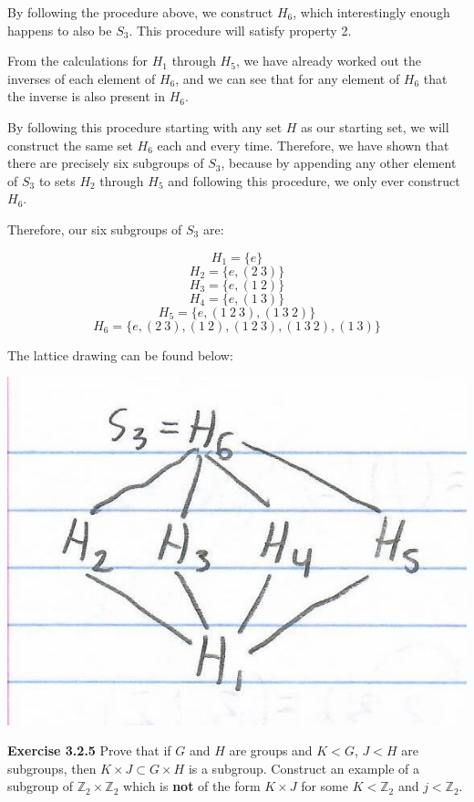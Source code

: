 \documentclass[a4paper]{article}
\begin{document}
\begin{myparindent}{0pt}
By following the procedure above, we construct $H_6$, which interestingly enough
happens to also be $S_3$. This procedure will satisfy property 2. \newline

From the calculations for $H_1$ through $H_5$, we have already worked out the
inverses of each element of $H_6$, and we can see that for any element of $H_6$
that the inverse is also present in $H_6$. \newline

By following this procedure starting with any set $H$ as our starting set, we
will construct the same set $H_6$ each and every time. Therefore, we have shown
that there are precisely six subgroups of $S_3$, because by appending any other
element of $S_3$ to sets $H_2$ through $H_5$ and following this procedure, we
only ever construct $H_6$. \newline

Therefore, our six subgroups of $S_3$ are:

\[ H_1 = \{e\} \]
\[ H_2 = \{e, (2 ~3)\} \]
\[ H_3 = \{e, (1 ~2)\} \]
\[ H_4 = \{e, (1 ~3)\} \]
\[ H_5 = \{e, (1 ~2 ~3), (1 ~3 ~2) \} \]
\[ H_6 = \{ e, (2 ~3), (1 ~2), (1 ~2 ~3), (1 ~3 ~2), (1 ~3) \} \]

The lattice drawing can be found below:

\includegraphics{lattice-S3}

\textbf{Exercise 3.2.5}
Prove that if $G$ and $H$ are groups and $K < G$, $J < H$ are subgroups, then
$K \times J \subset G \times H$ is a subgroup. Construct an example of a
subgroup of $\mathbb{Z}_2 \times \mathbb{Z}_2$ which is \textbf{not} of the form
$K \times J$ for some $K < \mathbb{Z}_2$ and $j < \mathbb{Z}_2$.

\end{myparindent}
\end{document}
